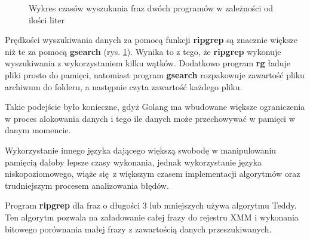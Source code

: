 \begin{figure}[htbp]
    \centering
    \caption{Wykres czasów wyszukania fraz dwóch programów w zależności od ilości liter}
    \label{fig:wykresPorównaniaCzasówWyszukań}
\end{figure}

Prędkości wyszukiwania danych za pomocą funkcji \textbf{ripgrep} są znacznie większe niż te
za pomocą \textbf{gsearch} (rys. \ref{fig:wykresPorównaniaCzasówWyszukań}). Wynika to z
tego, że \textbf{ripgrep} wykonuje wyszukiwania z wykorzystaniem kilku wątków. Dodatkowo 
program \textbf{rg} ładuje pliki prosto do pamięci, natomiast program \textbf{gsearch} rozpakowuje
zawartość pliku archiwum do folderu, a następnie czyta zawartość każdego pliku.

Takie podejście było konieczne, gdyż Golang ma wbudowane większe ograniczenia w 
proces alokowania danych i tego ile danych może przechowywać w pamięci w danym momencie.

Wykorzystanie innego języka dającego większą swobodę w manipulowaniu pamięcią 
dałoby lepsze czasy wykonania, jednak wykorzystanie języka niskopoziomowego,
wiąże się z większym czasem implementacji algorytmów oraz trudniejszym procesem
analizowania błędów.

Program \textbf{ripgrep} dla fraz o długości 3 lub mniejszych używa algorytmu Teddy. Ten algorytm
pozwala na załadowanie całej frazy do rejestru XMM i wykonania bitowego 
porównania małej frazy z zawartością danych przeszukiwanych.

